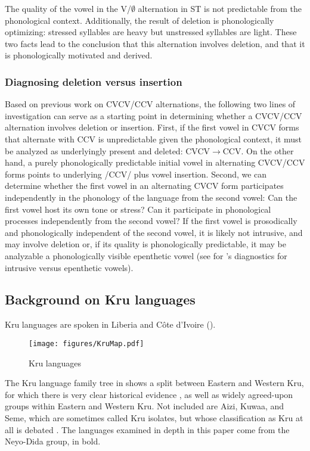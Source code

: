 \documentclass[output=paper,colorlinks,citecolor=brown]{langscibook}
\begin{document}
\noindent The quality of the vowel in the V/$\emptyset$ alternation in ST is not predictable from the phonological context. Additionally, the result of deletion is phonologically optimizing: stressed syllables are heavy but unstressed syllables are light. These two facts lead to the conclusion that this alternation involves deletion, and that it is phonologically motivated and derived. 

\subsubsection{Diagnosing deletion versus insertion}\label{sec:diagnostics}
Based on previous work on CVCV\slash CCV alternations, the following two lines of investigation can serve as a starting point in determining whether a CVCV\slash CCV alternation involves deletion or insertion. First, if the first vowel in CVCV forms that alternate with CCV is unpredictable given the phonological context, it must be analyzed as underlyingly present and deleted: CVCV$\rightarrow$CCV. On the other hand, a purely phonologically predictable initial vowel in alternating CVCV\slash CCV forms points to underlying /CCV/ plus vowel insertion. Second, we can determine whether the first vowel in an alternating CVCV form participates independently in the phonology of the language from the second vowel: Can the first vowel host its own tone or stress? Can it participate in phonological processes independently from the second vowel? If the first vowel is prosodically and phonologically independent of the second vowel, it is likely not intrusive, and may involve deletion or, if its quality is phonologically predictable, it may be analyzable a phonologically visible epenthetic vowel (see  for \citeauthor{Hall2006}'s diagnostics for intrusive versus epenthetic vowels).

\subsection{Background on Kru languages}\label{sec:background}
Kru languages are spoken in Liberia and Côte d'Ivoire ().

\begin{figure}
\caption{Kru languages \citep{Marchese:1979}}
\texttt{[image: figures/KruMap.pdf]}
\label{KruMap}
\end{figure}
 
The Kru language family tree in  shows a split between Eastern and Western Kru, for which there is very clear historical evidence \citep{Marchese:1986, Zogbo:2012, Zogbo:2019}, as well as widely agreed-upon groups within Eastern and Western Kru. Not included are Aizi, Kuwaa, and Seme, which are sometimes called Kru isolates, but whose classification as Kru at all is debated \citep{Marchese:1979, Herault:1971, Vogler:2020}. The languages examined in depth in this paper come from the Neyo-Dida group, in bold.
\end{document}
